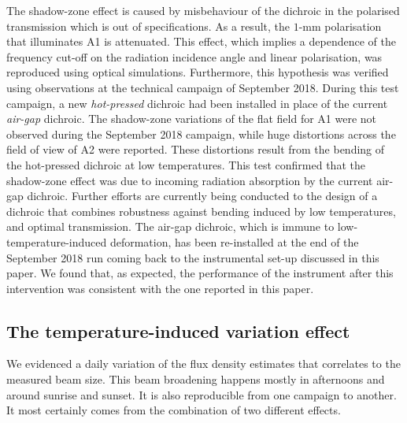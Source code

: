 \documentclass[traditionalabstract]{aa}
\newcommand{\lp}[1]{#1}
\begin{document}
{The shadow-zone effect is caused by {\lp misbehaviour of the dichroic in
the polarised transmission which is out of specifications. As a
result, the $1$-mm polarisation that illuminates A1 is
attenuated.}
This effect,
which implies {\lp a dependence of the frequency cut-off on the radiation
incidence angle and linear polarisation,}
was reproduced using optical simulations. Furthermore, this hypothesis was
verified using observations at the technical campaign of September
2018. During this test campaign, a new \emph{hot-pressed} dichroic had
been installed in place of the current \emph{air-gap} dichroic.
The shadow-zone variations of the flat field for A1 were
not observed during the September 2018 campaign, while huge distortions
across the field of view of A2 were reported. These distortions result from the bending of the hot-pressed dichroic at low temperatures.
This test confirmed that the shadow-zone effect was due
to incoming radiation absorption by the current air-gap dichroic.
Further efforts are currently being conducted to the design of a dichroic that
combines robustness against bending induced by low temperatures, and
optimal transmission.
{\lp The air-gap dichroic, which is immune to low-temperature-induced
deformation, has been re-installed at the end of the September 2018
run coming back to the instrumental set-up discussed in this paper. We
found that, as expected, the performance of the instrument
after this intervention was consistent with the one reported in this
paper.}


\subsection{The temperature-induced variation effect}
\label{se:beam_variation}

We evidenced a daily variation of the flux density estimates that correlates to the
measured beam size. This beam broadening happens mostly in afternoons and around
sunrise and sunset. It is also reproducible from one campaign to another. It most certainly
comes from the combination of two different effects.

}
\end{document}
